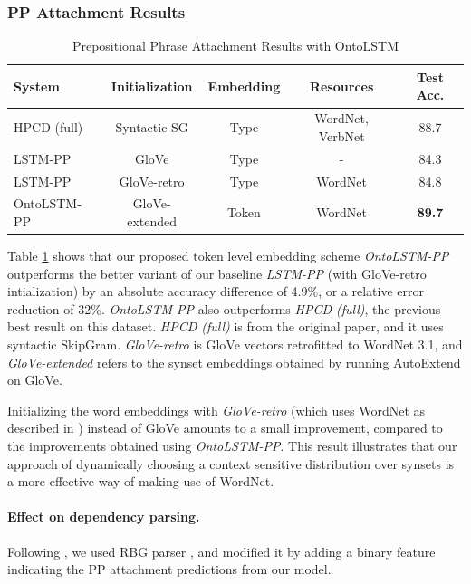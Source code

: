 \subsubsection{PP Attachment Results}
\begin{table}
    \centering
    \begin{tabular}{|l|c|c|c|c|}
    \hline
    \textbf{System} & \textbf{Initialization} & \textbf{Embedding} & \textbf{Resources} & \textbf{Test Acc.}\\
    \hline
    HPCD (full) & Syntactic-SG & Type & WordNet, VerbNet & 88.7 \\
    \hline
    LSTM-PP  & GloVe & Type & - & 84.3 \\
    LSTM-PP & GloVe-retro & Type & WordNet & 84.8 \\
    OntoLSTM-PP & GloVe-extended & Token & WordNet & \textbf{89.7} \\
    \hline
    \end{tabular}
    \caption{Prepositional Phrase Attachment Results with OntoLSTM}
    \label{tab:ontolstm_direct_ppa_results}
\end{table}
Table \ref{tab:ontolstm_direct_ppa_results} shows that our proposed token level embedding scheme \textit{OntoLSTM-PP} outperforms the better variant of our baseline \textit{LSTM-PP} (with GloVe-retro intialization) by an absolute accuracy difference of 4.9\%, 
or a relative error reduction of 32\%.
\textit{OntoLSTM-PP} also outperforms \textit{HPCD (full)}, the previous best result on this dataset. \textit{HPCD (full)} is from the original paper, and it uses syntactic SkipGram. \textit{GloVe-retro} is GloVe vectors retrofitted \cite{faruqui:15} to WordNet 3.1, and \textit{GloVe-extended} refers to the synset embeddings obtained by running AutoExtend \cite{rothe:15} on GloVe.

Initializing the word embeddings with \textit{GloVe-retro} (which uses WordNet as described in \citet{faruqui:15}) instead of GloVe amounts to a small improvement, compared to the improvements obtained using \textit{OntoLSTM-PP}.
This result illustrates that our approach of dynamically choosing a context sensitive distribution over synsets is a more effective way of making use of WordNet.


\paragraph{Effect on dependency parsing.} Following \cite{belinkov2014exploring}, we used RBG parser \cite{lei2014low}, and modified it by adding a binary feature indicating the PP attachment predictions from our model. 

